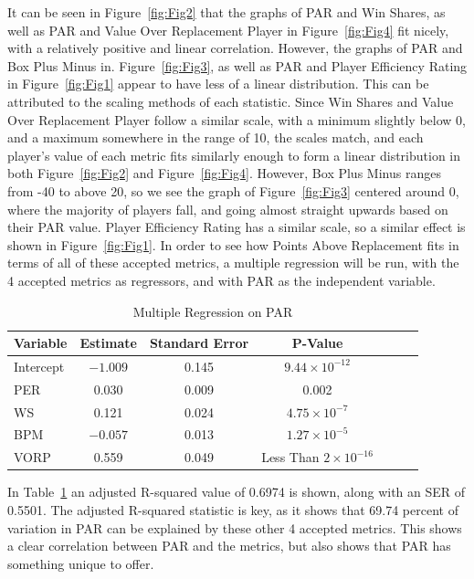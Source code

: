 \documentclass[12pt]{article}
\begin{document}
It can be seen in Figure~\ref{fig:Fig2} that the graphs of PAR and Win 
Shares, as 
well as PAR 
and Value Over Replacement Player in Figure~\ref{fig:Fig4}
fit nicely, with a relatively positive and linear correlation. However, the 
graphs of PAR and Box Plus Minus in. Figure~\ref{fig:Fig3}, 
as well as PAR and Player Efficiency Rating in Figure~\ref{fig:Fig1} 
appear to 
have less of a 
linear distribution. This can be 
attributed to the scaling methods of each statistic. Since Win Shares and 
Value Over Replacement Player 
follow a similar scale, with a minimum slightly below 0, and a maximum 
somewhere in the range of 10, the 
scales match, and each player's value of each metric fits similarly enough 
to form a linear distribution in both Figure~\ref{fig:Fig2} and 
Figure~\ref{fig:Fig4}. 
However, Box Plus Minus ranges from -40 to above 20, so we see the 
graph of Figure~\ref{fig:Fig3} centered around 0, where the 
majority of players fall, and going almost straight upwards based on their 
PAR value. Player Efficiency 
Rating has a similar scale, so a similar effect is shown in 
Figure~\ref{fig:Fig1}. In 
order to see 
how Points Above Replacement fits 
in terms of all of these accepted metrics, a multiple regression will be run, 
with the 4 accepted metrics as 
regressors, and with PAR as the independent variable.

\begin{table}[H]
  \caption{Multiple Regression on PAR}
  \label{tab:MultipleRegression}
\centering
\begin{tabular}[t]{lcccccc}
  \toprule
  Variable &  Estimate & Standard Error & P-Value\\
  \midrule
Intercept & $-1.009$  & 0.145 & $9.44 \times 10^{-12}$\\
PER & 0.030 & 0.009 & 0.002\\
WS & 0.121 & 0.024 & $4.75 \times 10^{-7}$\\
BPM & $-0.057$ & 0.013 & $1.27 \times 10^{-5}$\\
VORP & 0.559 & 0.049 & Less Than $2 \times 10^{-16}$\\
  \bottomrule
\end{tabular}
\end{table}

In Table~\ref{tab:MultipleRegression} an adjusted R-squared value of 
0.6974 is shown, along with an SER of 0.5501. The adjusted R-squared
statistic is key, as it shows that 69.74 percent of variation 
in PAR can be explained by these other 4 accepted metrics. This shows a 
clear correlation between PAR 
and the metrics, but also shows that PAR has something unique to offer.
\end{document}

